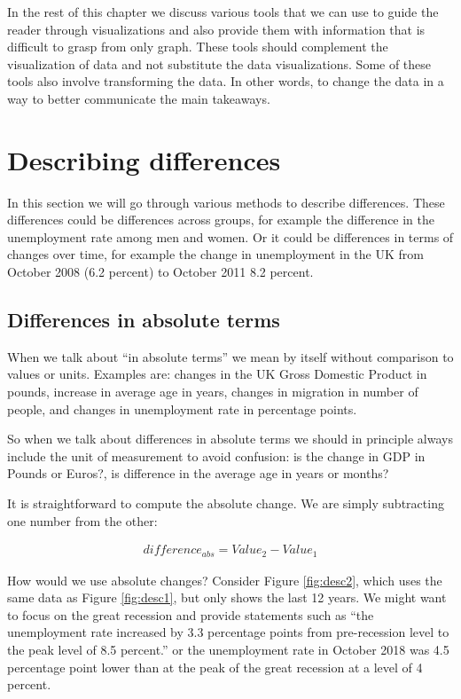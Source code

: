 \documentclass[]{book}
\begin{document}
In the rest of this chapter we discuss various tools that we can use to guide the reader through visualizations and also provide them with information that is difficult to grasp from only graph. These tools should complement the visualization of data and not substitute the data visualizations. Some of these tools also involve transforming the data. In other words, to change the data in a way to better communicate the main takeaways.

\hypertarget{describing-differences}{%
\section{Describing differences}\label{describing-differences}}

In this section we will go through various methods to describe differences. These differences could be differences across groups, for example the difference in the unemployment rate among men and women. Or it could be differences in terms of changes over time, for example the change in unemployment in the UK from October 2008 (6.2 percent) to October 2011 8.2 percent.

\hypertarget{differences-in-absolute-terms}{%
\subsection{Differences in absolute terms}\label{differences-in-absolute-terms}}

When we talk about ``in absolute terms'' we mean by itself without comparison to values or units. Examples are: changes in the UK Gross Domestic Product in pounds, increase in average age in years, changes in migration in number of people, and changes in unemployment rate in percentage points.

So when we talk about differences in absolute terms we should in principle always include the unit of measurement to avoid confusion: is the change in GDP in Pounds or Euros?, is difference in the average age in years or months?

It is straightforward to compute the absolute change. We are simply subtracting one number from the other:

\begin{align}
  difference_{abs}=Value_2-Value_1
\end{align}

How would we use absolute changes? Consider Figure \ref{fig:desc2}, which uses the same data as Figure \ref{fig:desc1}, but only shows the last 12 years. We might want to focus on the great recession and provide statements such as ``the unemployment rate increased by 3.3 percentage points from pre-recession level to the peak level of 8.5 percent.'' or the unemployment rate in October 2018 was 4.5 percentage point lower than at the peak of the great recession at a level of 4 percent.
\end{document}
